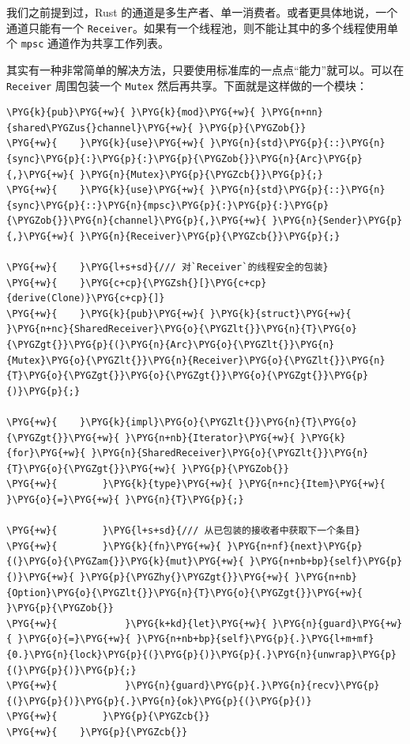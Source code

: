 我们之前提到过，Rust 的通道是多生产者、单一消费者。或者更具体地说，一个通道只能有一个 \texttt{Receiver}。如果有一个线程池，则不能让其中的多个线程使用单个 \texttt{mpsc} 通道作为共享工作列表。

其实有一种非常简单的解决方法，只要使用标准库的一点点“能力”就可以。可以在 \texttt{Receiver} 周围包装一个 \texttt{Mutex} 然后再共享。下面就是这样做的一个模块：

\begin{Verbatim}[commandchars=\\\{\},breaklines=true,breakanywhere=true,fontsize=\codefont,xleftmargin=17bp]
\PYG{k}{pub}\PYG{+w}{ }\PYG{k}{mod}\PYG{+w}{ }\PYG{n+nn}{shared\PYGZus{}channel}\PYG{+w}{ }\PYG{p}{\PYGZob{}}
\PYG{+w}{    }\PYG{k}{use}\PYG{+w}{ }\PYG{n}{std}\PYG{p}{::}\PYG{n}{sync}\PYG{p}{:}\PYG{p}{:}\PYG{p}{\PYGZob{}}\PYG{n}{Arc}\PYG{p}{,}\PYG{+w}{ }\PYG{n}{Mutex}\PYG{p}{\PYGZcb{}}\PYG{p}{;}
\PYG{+w}{    }\PYG{k}{use}\PYG{+w}{ }\PYG{n}{std}\PYG{p}{::}\PYG{n}{sync}\PYG{p}{::}\PYG{n}{mpsc}\PYG{p}{:}\PYG{p}{:}\PYG{p}{\PYGZob{}}\PYG{n}{channel}\PYG{p}{,}\PYG{+w}{ }\PYG{n}{Sender}\PYG{p}{,}\PYG{+w}{ }\PYG{n}{Receiver}\PYG{p}{\PYGZcb{}}\PYG{p}{;}

\PYG{+w}{    }\PYG{l+s+sd}{/// 对`Receiver`的线程安全的包装}
\PYG{+w}{    }\PYG{c+cp}{\PYGZsh{}[}\PYG{c+cp}{derive(Clone)}\PYG{c+cp}{]}
\PYG{+w}{    }\PYG{k}{pub}\PYG{+w}{ }\PYG{k}{struct}\PYG{+w}{ }\PYG{n+nc}{SharedReceiver}\PYG{o}{\PYGZlt{}}\PYG{n}{T}\PYG{o}{\PYGZgt{}}\PYG{p}{(}\PYG{n}{Arc}\PYG{o}{\PYGZlt{}}\PYG{n}{Mutex}\PYG{o}{\PYGZlt{}}\PYG{n}{Receiver}\PYG{o}{\PYGZlt{}}\PYG{n}{T}\PYG{o}{\PYGZgt{}}\PYG{o}{\PYGZgt{}}\PYG{o}{\PYGZgt{}}\PYG{p}{)}\PYG{p}{;}

\PYG{+w}{    }\PYG{k}{impl}\PYG{o}{\PYGZlt{}}\PYG{n}{T}\PYG{o}{\PYGZgt{}}\PYG{+w}{ }\PYG{n+nb}{Iterator}\PYG{+w}{ }\PYG{k}{for}\PYG{+w}{ }\PYG{n}{SharedReceiver}\PYG{o}{\PYGZlt{}}\PYG{n}{T}\PYG{o}{\PYGZgt{}}\PYG{+w}{ }\PYG{p}{\PYGZob{}}
\PYG{+w}{        }\PYG{k}{type}\PYG{+w}{ }\PYG{n+nc}{Item}\PYG{+w}{ }\PYG{o}{=}\PYG{+w}{ }\PYG{n}{T}\PYG{p}{;}

\PYG{+w}{        }\PYG{l+s+sd}{/// 从已包装的接收者中获取下一个条目}
\PYG{+w}{        }\PYG{k}{fn}\PYG{+w}{ }\PYG{n+nf}{next}\PYG{p}{(}\PYG{o}{\PYGZam{}}\PYG{k}{mut}\PYG{+w}{ }\PYG{n+nb+bp}{self}\PYG{p}{)}\PYG{+w}{ }\PYG{p}{\PYGZhy{}\PYGZgt{}}\PYG{+w}{ }\PYG{n+nb}{Option}\PYG{o}{\PYGZlt{}}\PYG{n}{T}\PYG{o}{\PYGZgt{}}\PYG{+w}{ }\PYG{p}{\PYGZob{}}
\PYG{+w}{            }\PYG{k+kd}{let}\PYG{+w}{ }\PYG{n}{guard}\PYG{+w}{ }\PYG{o}{=}\PYG{+w}{ }\PYG{n+nb+bp}{self}\PYG{p}{.}\PYG{l+m+mf}{0.}\PYG{n}{lock}\PYG{p}{(}\PYG{p}{)}\PYG{p}{.}\PYG{n}{unwrap}\PYG{p}{(}\PYG{p}{)}\PYG{p}{;}
\PYG{+w}{            }\PYG{n}{guard}\PYG{p}{.}\PYG{n}{recv}\PYG{p}{(}\PYG{p}{)}\PYG{p}{.}\PYG{n}{ok}\PYG{p}{(}\PYG{p}{)}
\PYG{+w}{        }\PYG{p}{\PYGZcb{}}
\PYG{+w}{    }\PYG{p}{\PYGZcb{}}


\end{Verbatim}
